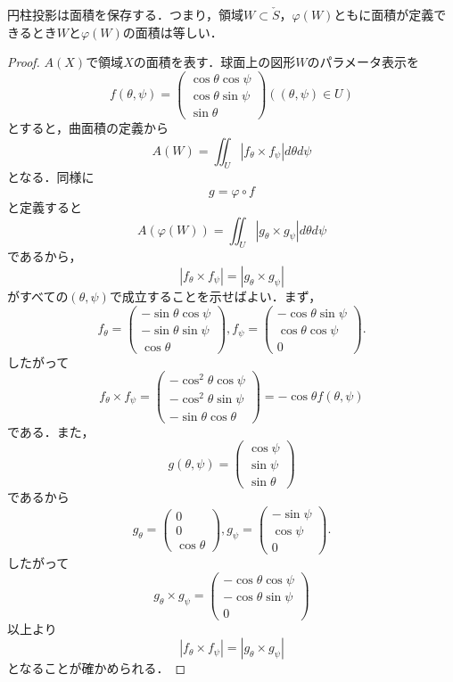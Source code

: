 \documentclass[uplatex]{jsarticle}
\begin{document}
\begin{theorem} 円柱投影は面積を保存する．つまり，領域$W\subset\check{S}$，$\varphi(W)$ともに面積が定義できるとき$W$と$\varphi(W)$の面積は等しい．
\end{theorem}
\begin{proof}
$A(X)$で領域$X$の面積を表す．球面上の図形$W$のパラメータ表示を
\[ f(\theta,\psi)=\begin{pmatrix} \cos \theta \cos \psi\\\cos \theta \sin \psi\\\sin \theta \end{pmatrix}  ((\theta,\psi)\in U)\]
とすると，曲面積の定義から
\[ A(W)=\iint_U |f_{\theta}\times f_{\psi}|d\theta d\psi \]
となる．同様に
\[ g=\varphi \circ f \]
と定義すると
\[ A(\varphi(W))=\iint_U |g_{\theta}\times g_{\psi}|d\theta d\psi \]
であるから，
\[ |f_{\theta}\times f_{\psi}|=|g_{\theta}\times g_{\psi}| \]
がすべての$(\theta,\psi)$で成立することを示せばよい．まず，
\[ f_{\theta}=\begin{pmatrix}-\sin \theta \cos \psi \\-\sin \theta \sin \psi \\\cos \theta \end{pmatrix},f_{\psi}=\begin{pmatrix}-\cos \theta \sin \psi \\\cos \theta \cos \psi \\0 \end{pmatrix} .\]
したがって
\[ f_{\theta} \times f_{\psi}=\begin{pmatrix}-\cos ^2 \theta \cos \psi\\-\cos ^2 \theta \sin \psi\\-\sin \theta \cos \theta \end{pmatrix}=-\cos \theta f(\theta,\psi) \]
である．また，
\[ g(\theta,\psi)=\begin{pmatrix}  \cos \psi\\ \sin \psi\\\sin \theta \end{pmatrix} \]
であるから
\[ g_\theta=\begin{pmatrix}0 \\ 0 \\ \cos \theta \end{pmatrix},g_\psi=\begin{pmatrix}-\sin\psi\\ \cos \psi \\0 \end{pmatrix}. \]
したがって
\[ g_{\theta}\times g_{\psi}=\begin{pmatrix} -\cos \theta \cos \psi\\ -\cos \theta \sin \psi \\ 0 \end{pmatrix} \]
以上より
\[ |f_{\theta}\times f_{\psi}|=|g_{\theta}\times g_{\psi}| \]
となることが確かめられる．
\end{proof}
\end{document}
